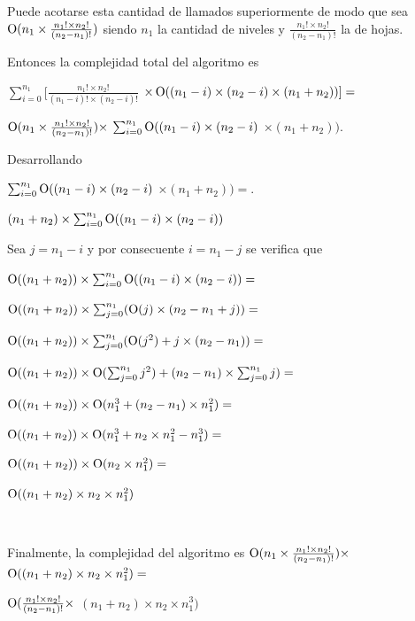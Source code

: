 Puede acotarse esta cantidad de llamados superiormente de modo que sea
$\operatorname{O}(n_1 \times \frac{n_1! \times n_2!}{(n_2 - n_1)!})$ siendo $n_1$ la
cantidad de niveles y $\frac{n_1! \times n_2!}{(n_2 - n_1)!}$ la de hojas.

Entonces la complejidad total del algoritmo es

$\sum_{i = 0}^{n_1}[\frac{n_1! \times n_2!}{(n_1 - i)! \times (n_2 - i)!}$
$\times \operatorname{O}((n_1 - i) \times (n_2 - i) \times (n_1 + n_2))]=$

$\operatorname{O}(n_1 \times \frac{n_1! \times n_2!}{(n_2 - n_1)!}) \times$
$\sum_{i = 0}^{n_1}\operatorname{O}((n_1 - i) \times (n_2 - i)$
$\times (n_1 + n_2))$.

Desarrollando

$\sum_{i = 0}^{n_1}\operatorname{O}((n_1 - i) \times (n_2 - i)$
$\times (n_1 + n_2))=$.

$(n_1 + n_2) \times \sum_{i = 0}^{n_1}\operatorname{O}((n_1 - i) \times (n_2 - i))$

Sea $j = n_1 - i$ y por consecuente $i = n_1 - j$ se verifica que

$\operatorname{O}((n_1 + n_2)) \times \sum_{i = 0}^{n_1} \operatorname{O}((n_1 - i) \times (n_2 - i))=$

$\operatorname{O}((n_1 + n_2)) \times \sum_{j = 0}^{n_1} (\operatorname{O}(j) \times (n_2 - n_1 + j))=$

$\operatorname{O}((n_1 + n_2)) \times \sum_{j = 0}^{n_1} (\operatorname{O}(j^2) + j \times (n_2 - n_1))=$

$\operatorname{O}((n_1 + n_2)) \times \operatorname{O}(\sum_{j = 0}^{n_1} j^2) + (n_2 - n_1) \times \sum_{j = 0}^{n_1} j)=$

$\operatorname{O}((n_1 + n_2)) \times \operatorname{O}(n_1^3 + (n_2 - n_1) \times n_1^2)=$

$\operatorname{O}((n_1 + n_2)) \times \operatorname{O}(n_1^3 + n_2 \times n_1^2 - n_1^3)=$

$\operatorname{O}((n_1 + n_2)) \times \operatorname{O}(n_2 \times n_1^2)=$

$\operatorname{O}((n_1 + n_2) \times n_2 \times n_1^2)$

~

Finalmente, la complejidad del algoritmo es
$\operatorname{O}(n_1 \times \frac{n_1! \times n_2!}{(n_2 - n_1)!}) \times$
$\operatorname{O}((n_1 + n_2) \times n_2 \times n_1^2)=$

\begin{center}
$\operatorname{O}(\frac{n_1! \times n_2!}{(n_2 - n_1)!} \times$
$(n_1 + n_2) \times n_2 \times n_1^3)$
\end{center}

